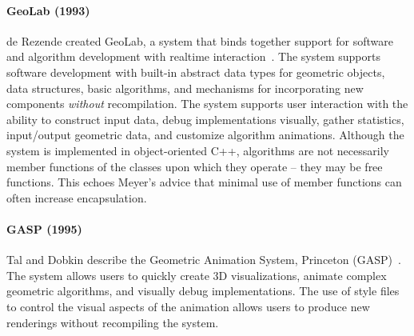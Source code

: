 \paragraph{GeoLab (1993)}

de Rezende created GeoLab, a system that binds together support for software and
algorithm development with realtime interaction~\cite{de1993geolab,
de1993animation}. The system supports software development with built-in
abstract data types for geometric objects, data structures, basic algorithms,
and mechanisms for incorporating new components \emph{without} recompilation.
The system supports user interaction with the ability to construct input data,
debug implementations visually, gather statistics, input/output geometric data,
and customize algorithm animations. Although the system is implemented in
object-oriented C++, algorithms are not necessarily member functions of the
classes upon which they operate -- they may be free functions. This echoes
Meyer's advice that minimal use of member functions can often increase
encapsulation.



\paragraph{GASP (1995)}

Tal and Dobkin describe the Geometric Animation System, Princeton
(GASP)~\cite{tal1995visualization}. The system allows users to quickly create 3D
visualizations, animate complex geometric algorithms, and visually debug
implementations. The use of style files to control the visual aspects of the
animation allows users to produce new renderings without recompiling the system.

